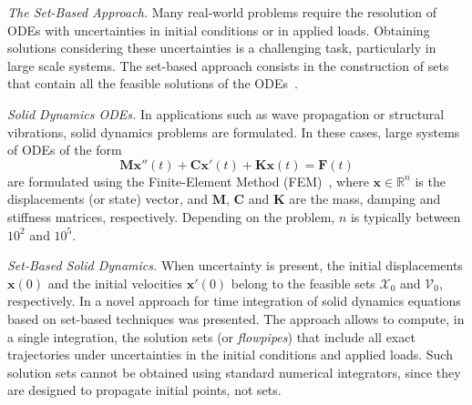 \documentclass{juliacon}
\begin{document}
	


\maketitle

\emph{The Set-Based Approach.} %
%
Many real-world problems require the resolution of ODEs with uncertainties in initial conditions or in applied loads. Obtaining solutions considering these uncertainties is a challenging task, particularly in large scale systems. The set-based approach consists in the construction of sets that contain all the feasible solutions of the ODEs~\cite{althoff2020set}. %


\vspace{0.2cm}

\emph{Solid Dynamics ODEs.} %
%
In applications such as wave propagation or structural vibrations, solid dynamics problems are formulated. In these cases, large systems of ODEs of the form
%
\begin{equation}\label{eq:second_order}
\mathbf{M} \mathbf{x}''(t) + \mathbf{C}\mathbf{x}'(t) + \mathbf{K}\mathbf{x}(t) = \mathbf{F}(t)
\end{equation}
%
are formulated using the Finite-Element Method (FEM)~\cite{Bathe2014}, where $\mathbf{x} \in \mathbb{R}^n$ is the displacements (or state) vector, and $\mathbf{M}$, $\mathbf{C}$ and $\mathbf{K}$ are the mass, damping and stiffness matrices, respectively. Depending on the problem, $n$ is typically  between $10^2$ and $10^5$.

	
\vspace{0.2cm}

\emph{Set-Based Solid Dynamics.} %
%
When uncertainty is present, the initial displacements $\mathbf{x}(0)$ and the initial velocities $\mathbf{x}'(0)$ belong to the feasible sets $\mathcal{X}_0$ and  $\mathcal{V}_0$, respectively. %
%
In \cite{forets2021combining} a novel approach for time integration of solid dynamics equations based on set-based techniques was presented. %
%
The approach allows to compute, in a single integration, the solution sets (or \emph{flowpipes}) that include all exact trajectories under uncertainties in the initial conditions and applied loads.
%
Such solution sets cannot be obtained using standard numerical integrators, since they are designed to propagate initial points, not sets.

\vspace{0.2cm}
\end{document}

